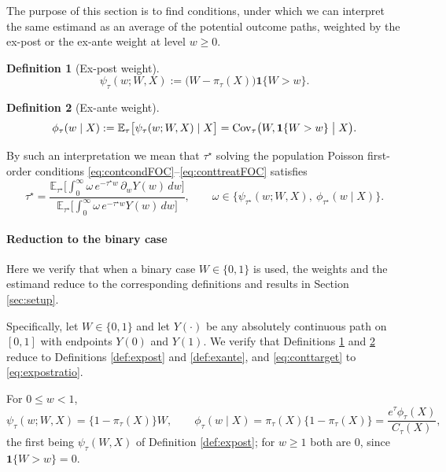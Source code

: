 \documentclass[11pt]{article}
\theoremstyle{definition}
\newtheorem{definition}{Definition}
\theoremstyle{plain}
\newcommand{\E}{\mathbb{E}}
\newcommand{\1}{\mathbf{1}}
\begin{document}
The purpose of this section is to find conditions, under which we can interpret the same estimand as an average of the potential outcome paths, weighted by the ex-post or the ex-ante weight at level $w\ge 0$.

\begin{definition}[Ex-post weight]
\label{def:contexpost}
\begin{equation}
\psi_\tau(w;W,X):=\bigl(W-\pi_\tau(X)\bigr)\1\{W>w\} .
\label{eq:contexpost}
\end{equation}
\end{definition}

\begin{definition}[Ex-ante weight]
\label{def:contexante}
\begin{equation}
\phi_\tau(w\mid X):=\E_\tau\bigl[\psi_\tau(w;W,X)\mid X\bigr]
=\operatorname{Cov}_\tau\bigl(W,\1\{W>w\}\bigm| X\bigr).
\label{eq:contweights}
\end{equation}
\end{definition}

By such an interpretation we mean that $\tau^\star$ solving the population Poisson first-order conditions \eqref{eq:contcondFOC}--\eqref{eq:conttreatFOC} satisfies
\begin{equation}
\tau^\star
=
\frac{\E_{\tau^\star}\bigl[\int_0^\infty \omega\,e^{-\tau^\star w}\,\partial_wY(w)\,dw\bigr]}
     {\E_{\tau^\star}\bigl[\int_0^\infty \omega\,e^{-\tau^\star w}Y(w)\,dw\bigr]},
\qquad
\omega\in\bigl\{\psi_{\tau^\star}(w;W,X),\ \phi_{\tau^\star}(w\mid X)\bigr\}.
\label{eq:conttarget}
\end{equation}

\paragraph{Reduction to the binary case}

Here we verify that when a binary case $W\in\{0,1\}$ is used, the weights and the estimand reduce to the corresponding definitions and results in Section \ref{sec:setup}.

Specifically, let $W\in\{0,1\}$ and let $Y(\cdot)$ be any absolutely continuous path on $[0,1]$ with endpoints $Y(0)$ and $Y(1)$. We verify that Definitions \ref{def:contexpost} and \ref{def:contexante} reduce to Definitions \ref{def:expost} and \ref{def:exante}, and \eqref{eq:conttarget} to \eqref{eq:expostratio}.

For $0\le w<1$,
\[
\psi_\tau(w;W,X)=\bigl\{1-\pi_\tau(X)\bigr\}W,
\qquad
\phi_\tau(w\mid X)=\pi_\tau(X)\bigl\{1-\pi_\tau(X)\bigr\}=\frac{e^{\tau}\phi_\tau(X)}{C_\tau(X)},
\]
the first being $\psi_\tau(W,X)$ of Definition \ref{def:expost}; for $w\ge 1$ both are 0, since $\1\{W>w\}=0$.
\end{document}
